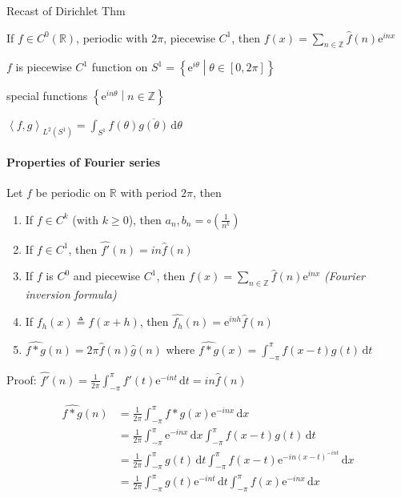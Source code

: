 Recast of Dirichlet Thm

If $f\in C^0(\mathbb{R})$, periodic with $2\pi$, piecewise $C^1$, then $f(x)=\sum_{n\in\mathbb{Z}}\hat{f}(n)\mathrm{e}^{inx}$

$f$ is piecewise $C^1$ function on $S^1=\left\{\mathrm{e}^{i\theta}\middle|\theta\in[0,2\pi]\right\}$

special functions $\left\{\mathrm{e}^{in\theta}\middle|n\in\mathbb{Z}\right\}$

$\left<f,g\right>_{L^2(S^1)}=\int_{S^1}f(\theta)\overline{g(\theta)}\,\mathrm{d}\theta$

\paragraph*{Properties of Fourier series}

\begin{theorem}
    Let $f$ be periodic on $\mathbb{R}$ with period $2\pi$, then
    \begin{enumerate}
        \item If $f\in C^k$ (with $k\geq 0$), then $a_n,b_n=\circ\left(\frac{1}{n^k}\right)$
        \item If $f\in C^1$, then $\hat{f'}(n)=in\hat{f}(n)$
        \item If $f$ is $C^0$ and piecewise $C^1$, then $f(x)=\sum_{n\in\mathbb{Z}}\hat{f}(n)\mathrm{e}^{inx}$ \emph{(Fourier inversion formula)}
        \item If $f_h(x)\triangleq f(x+h)$, then $\hat{f_h}(n)=\mathrm{e}^{inh}\hat{f}(n)$
        \item $\widehat{f*g}(n)=2\pi\hat{f}(n)\hat{g}(n)$ where $\widehat{f*g}(x)=\int_{-\pi}^{\pi}f(x-t)g(t)\,\mathrm{d}t$
    \end{enumerate}
\end{theorem}

Proof: $\hat{f'}(n)=\frac{1}{2\pi}\int_{-\pi}^{\pi}f'(t)\mathrm{e}^{-int}\,\mathrm{d}t=in\hat{f}(n)$

\begin{align*}
    \widehat{f*g}(n)
     & =\frac{1}{2\pi}\int_{-\pi}^{\pi}f*g(x)\mathrm{e}^{-inx}\,\mathrm{d}x                                                  \\
     & =\frac{1}{2\pi}\int_{-\pi}^{\pi}\mathrm{e}^{-inx}\,\mathrm{d}x\int_{-\pi}^{\pi}f(x-t)g(t)\,\mathrm{d}t                \\
     & =\frac{1}{2\pi}\int_{-\pi}^{\pi}g(t)\,\mathrm{d}t\int_{-\pi}^{\pi}f(x-t)\mathrm{e}^{-in(x-t)^{-int}}\,\mathrm{d}x     \\
     & =\frac{1}{2\pi}\int_{-\pi}^{\pi}g(t)\mathrm{e}^{-int}\,\mathrm{d}t\int_{-\pi}^{\pi}f(x)\mathrm{e}^{-inx}\,\mathrm{d}x
\end{align*}